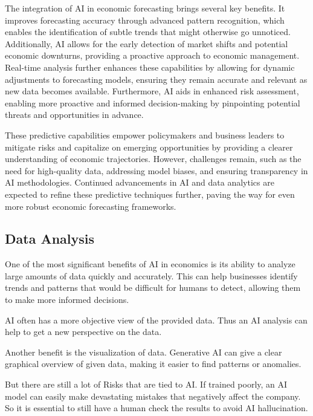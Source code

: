 The integration of AI in economic forecasting brings several key benefits. It improves forecasting accuracy through advanced pattern recognition, 
which enables the identification of subtle trends that might otherwise go unnoticed. Additionally, AI allows for the early detection of market shifts 
and potential economic downturns, providing a proactive approach to economic management. Real-time analysis further enhances these capabilities by 
allowing for dynamic adjustments to forecasting models, ensuring they remain accurate and relevant as new data becomes available. Furthermore, 
AI aids in enhanced risk assessment, enabling more proactive and informed decision-making by pinpointing potential threats and opportunities in advance.

These predictive capabilities empower policymakers and business leaders to mitigate risks and capitalize on emerging opportunities by providing a clearer understanding of economic trajectories. However, challenges remain, such as the need for high-quality data, addressing model biases, and ensuring transparency in AI methodologies. Continued advancements in AI and data analytics are expected to refine these predictive techniques further, paving the way for even more robust economic forecasting frameworks.

\cite{futur-econ-pre}


\subsection{Data Analysis}
\label{subsec:data-analysis}

One of the most significant benefits of AI in economics is its ability to analyze large amounts of data quickly and accurately. 
This can help businesses identify trends and patterns that would be difficult for humans to detect, allowing them to make more informed decisions.

AI often has a more objective view of the provided data. Thus an AI analysis can help to get a new perspective on the data. 

Another benefit is the visualization of data. Generative AI can give a clear graphical overview of given data, making it easier to find patterns or anomalies. 

But there are still a lot of Risks that are tied to AI.
If trained poorly, an AI model can easily make devastating mistakes that negatively affect the company.
So it is essential to still have a human check the results to avoid AI hallucination.

